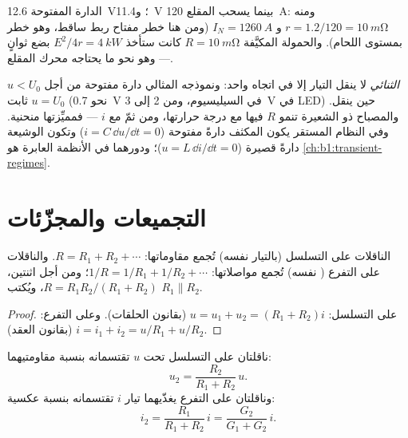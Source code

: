 \begin{example}\label{ex:b1:dc-circuits:battery}
الدارة المفتوحة \qty{12.6}{V}؛ و\qty{11.4}{V} بينما يسحب المقلع
\qty{120}{A}: ومنه $r = 1.2/120 = \qty{10}{m\ohm}$ و $I_N = \qty{1260}{A}$
(ومن هنا خطر مفتاح ربط ساقط، وهو خطر بمستوى اللحام). والحمولة المكيَّفة
$R = \qty{10}{m\ohm}$ كانت ستأخذ $E^2/4r = \qty{4}{kW}$ بضع
ثوانٍ --- وهو نحو ما يحتاجه محرك المقلع.
\end{example}

\begin{remark}\label{rem:b1:dc-circuits:others}
\emph{الثنائي} لا ينقل التيار إلا في اتجاه واحد: ونموذجه المثالي
دارة مفتوحة من أجل $u < U_0$  ثابت $u = U_0$ (نحو
\qty{0.7}{V} في السيليسيوم، ومن \qty{2}{} إلى \qty{3}{V} في LED) حين
ينقل. والمصباح ذو الشعيرة  تنمو $R$ فيها مع
درجة حرارتها، ومن ثمّ مع $i$ --- فمميِّزتها منحنية. وفي النظام
المستقر يكون المكثف دارةً مفتوحة ($i = C\,\dd u/\dd t = 0$) وتكون
الوشيعة دارةً قصيرة ($u = L\,\dd i/\dd t = 0$)؛ ودورهما في
الأنظمة العابرة هو \cref{ch:b1:transient-regimes}.
\end{remark}

\section{التجميعات والمجزّئات}

\begin{proposition}\label{prop:b1:dc-circuits:seriesparallel}
الناقلات على التسلسل (بالتيار نفسه) تُجمع مقاوماتها: $R = R_1 + R_2 + \cdots$.
والناقلات على التفرع ( نفسه) تُجمع مواصلاتها:
$1/R = 1/R_1 + 1/R_2 + \cdots$؛ ومن أجل اثنتين، $R = R_1R_2/(R_1 + R_2)$،
ويُكتب $R_1 \parallel R_2$.
\end{proposition}

\begin{proof}
على التسلسل: $u = u_1 + u_2 = (R_1 + R_2)i$ (بقانون الحلقات). وعلى التفرع: $i = i_1 +
i_2 = u/R_1 + u/R_2$ (بقانون العقد).
\end{proof}

\begin{proposition}\label{prop:b1:dc-circuits:dividers}
ناقلتان على التسلسل تحت  $u$ تقتسمانه بنسبة
مقاومتيهما:
\[
u_2 = \frac{R_2}{R_1 + R_2}\,u .
\]
وناقلتان على التفرع يغذّيهما تيار $i$ تقتسمانه بنسبة
عكسية:
\[
i_2 = \frac{R_1}{R_1 + R_2}\,i = \frac{G_2}{G_1 + G_2}\,i .
\]
\end{proposition}

